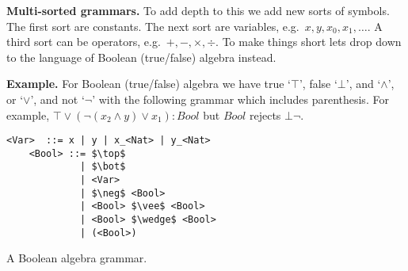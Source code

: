 \noindent\textbf{Multi-sorted grammars.} To add depth to this we add new sorts
of symbols.  The first sort are constants.  The next sort are variables, e.g.\
$x,y,x_0,x_1,\ldots$. A third sort can be operators, e.g.\ $+,-,\times,\div$.
To make things short lets drop down to the language of Boolean (true/false) algebra
instead.
\medskip

\noindent\textbf{Example.}
For Boolean (true/false) algebra we have true `$\top$', false `$\bot$', 
and `$\wedge$', or `$\vee$', and not `$\neg$' with the following grammar
which includes parenthesis. For example, $\top \vee (\neg(x_2\wedge y)\vee x_1):Bool$ but $Bool$ rejects $\bot\neg$.
\begin{lstfloat}[!hbtp]
\begin{lstlisting}[mathescape]
    <Var>  ::= x | y | x_<Nat> | y_<Nat>
    <Bool> ::= $\top$ 
             | $\bot$ 
             | <Var>
             | $\neg$ <Bool> 
             | <Bool> $\vee$ <Bool> 
             | <Bool> $\wedge$ <Bool>
             | (<Bool>)
\end{lstlisting}
\caption{A Boolean algebra grammar.}
\end{lstfloat}

